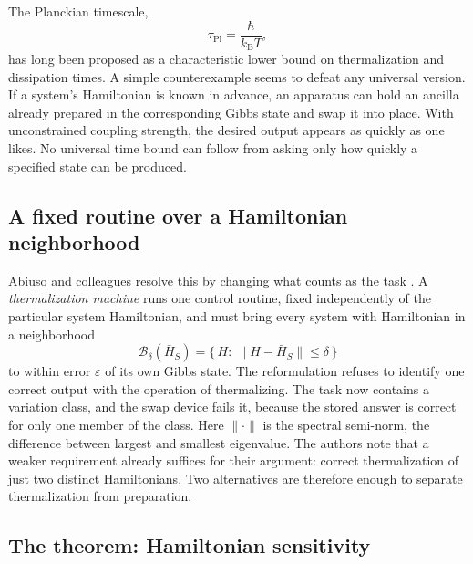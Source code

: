 \documentclass[11pt]{article}
\theoremstyle{definition}
\newcommand{\Ball}{\mathcal B}
\begin{document}
The Planckian timescale,
\begin{equation}
\tau_{\mathrm{Pl}}=\frac{\hbar}{k_{\mathrm B}T},
\end{equation}
has long been proposed as a characteristic lower bound on thermalization and dissipation times. A simple counterexample seems to defeat any universal version. If a system's Hamiltonian is known in advance, an apparatus can hold an ancilla already prepared in the corresponding Gibbs state and swap it into place. With unconstrained coupling strength, the desired output appears as quickly as one likes. No universal time bound can follow from asking only how quickly a specified state can be produced.

\subsection{A fixed routine over a Hamiltonian neighborhood}

Abiuso and colleagues resolve this by changing what counts as the task \cite{abiuso}. A \emph{thermalization machine} runs one control routine, fixed independently of the particular system Hamiltonian, and must bring every system with Hamiltonian in a neighborhood
\begin{equation}
\Ball_\delta(\bar H_S)=\{\,H:\ \|H-\bar H_S\|\le\delta\,\}
\end{equation}
to within error $\varepsilon$ of its own Gibbs state. The reformulation refuses to identify one correct output with the operation of thermalizing. The task now contains a variation class, and the swap device fails it, because the stored answer is correct for only one member of the class. Here $\|\cdot\|$ is the spectral semi-norm, the difference between largest and smallest eigenvalue. The authors note that a weaker requirement already suffices for their argument: correct thermalization of just two distinct Hamiltonians. Two alternatives are therefore enough to separate thermalization from preparation.

\subsection{The theorem: Hamiltonian sensitivity}
\end{document}
